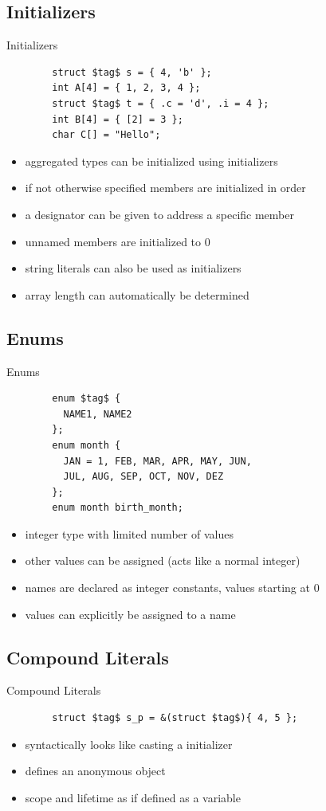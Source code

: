\documentclass[english,compress]{beamer}
\begin{document}
\subsection{Initializers}
\begin{frame}[fragile]{Initializers}
	\begin{lstlisting}
		struct $tag$ s = { 4, 'b' };
		int A[4] = { 1, 2, 3, 4 };
		struct $tag$ t = { .c = 'd', .i = 4 };
		int B[4] = { [2] = 3 };
		char C[] = "Hello";
	\end{lstlisting}
	\begin{itemize}
		\item aggregated types can be initialized using initializers
		\item if not otherwise specified members are initialized in order
		\item a designator can be given to address a specific member
		\item unnamed members are initialized to 0
		\item string literals can also be used as initializers
		\item array length can automatically be determined
	\end{itemize}
\end{frame}

\subsection{Enums}
\begin{frame}[fragile]{Enums}
	\begin{lstlisting}
		enum $tag$ {
		  NAME1, NAME2
		};
		enum month {
		  JAN = 1, FEB, MAR, APR, MAY, JUN,
		  JUL, AUG, SEP, OCT, NOV, DEZ
		};
		enum month birth_month;
	\end{lstlisting}
	\begin{itemize}
		\item integer type with limited number of values
		\item other values can be assigned (acts like a normal integer)
		\item names are declared as integer constants, values
			starting at 0
		\item values can explicitly be assigned to a name
	\end{itemize}
\end{frame}

\subsection{Compound Literals}
\begin{frame}[fragile]{Compound Literals}
	\begin{lstlisting}
		struct $tag$ s_p = &(struct $tag$){ 4, 5 };
	\end{lstlisting}
	\begin{itemize}
		\item syntactically looks like casting a initializer
		\item defines an anonymous object
		\item scope and lifetime as if defined as a variable
	\end{itemize}
\end{frame}
\end{document}
